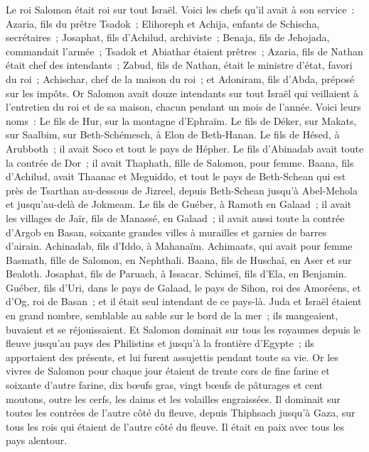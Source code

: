 \begin{multicols}{2}
\VerseOne{}Le roi Salomon était roi sur tout Israël.
Voici les chefs qu'il avait à son service~: Azaria, fils du prêtre Tsadok~;
Elihoreph et Achija, enfants de Schischa, secrétaires~; Josaphat, fils d'Achilud, archiviste~;
Benaja, fils de Jehojada, commandait l'armée~; Tsadok et Abiathar étaient prêtres~;
Azaria, fils de Nathan était chef des intendants~; Zabud, fils de Nathan, était le ministre d'état, favori du roi~;
Achischar, chef de la maison du roi~; et Adoniram, fils d'Abda, préposé sur les impôts.
Or Salomon avait douze intendants sur tout Israël qui veillaient à l'entretien du roi et de sa maison, chacun pendant un mois de l'année.
Voici leurs noms~: Le fils de Hur, sur la montagne d'Ephraïm.
Le fils de Déker, sur Makats, sur Saalbim, sur Beth-Schémesch, à Elon de Beth-Hanan.
Le fils de Hésed, à Arubboth~; il avait Soco et tout le pays de Hépher.
Le fils d'Abinadab avait toute la contrée de Dor~; il avait Thaphath, fille de Salomon, pour femme.
Baana, fils d'Achilud, avait Thaanac et Meguiddo, et tout le pays de Beth-Schean qui est près de Tsarthan au-dessous de Jizreel, depuis Beth-Schean jusqu'à Abel-Mehola et jusqu'au-delà de Jokmeam.
Le fils de Guéber, à Ramoth en Galaad~; il avait les villages de Jaïr, fils de Manassé, en Galaad~; il avait aussi toute la contrée d'Argob en Basan, soixante grandes villes à murailles et garnies de barres d'airain.
Achinadab, fils d'Iddo, à Mahanaïm.
Achimaats, qui avait pour femme Basmath, fille de Salomon, en Nephthali.
Baana, fils de Huschaï, en Aser et sur Bealoth.
Josaphat, fils de Paruach, à Issacar.
Schimeï, fils d'Ela, en Benjamin.
Guéber, fils d'Uri, dans le pays de Galaad, le pays de Sihon, roi des Amoréens, et d'Og, roi de Basan~; et il était seul intendant de ce pays-là.
Juda et Israël étaient en grand nombre, semblable au sable sur le bord de la mer~; ils mangeaient, buvaient et se réjouissaient.
Et Salomon dominait sur tous les royaumes depuis le fleuve jusqu'au pays des Philistins et jusqu'à la frontière d'Egypte~; ils apportaient des présents, et lui furent assujettis pendant toute sa vie.
Or les vivres de Salomon pour chaque jour étaient de trente cors de fine farine et soixante d'autre farine,
dix bœufs gras, vingt bœufs de pâturages et cent moutons, outre les cerfs, les daims et les volailles engraissées.
Il dominait sur toutes les contrées de l'autre côté du fleuve, depuis Thiphsach jusqu'à Gaza, sur tous les rois qui étaient de l'autre côté du fleuve. Il était en paix avec tous les pays alentour.

\end{multicols}
